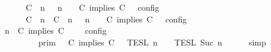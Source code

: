 \begin{isabellebody}
\ \ \ \ \ \ {\isacharequal}\ {\isasymlbrakk}\ {\isacharparenleft}{\isacharparenleft}C\ {\isasymnot}{\isasymUp}\ n{\isacharparenright}\ {\isacharhash}\ {\isasymGamma}{\isacharparenright}{\isacharcomma}\ n\ {\isasymturnstile}\ {\isasymPsi}\ {\isasymtriangleright}\ {\isacharparenleft}{\isacharparenleft}C\ implies\ C\ {\isacharhash}\ {\isasymPhi}{\isacharparenright}\ {\isasymrbrakk}\isactrlsub c\isactrlsub o\isactrlsub n\isactrlsub f\isactrlsub i\isactrlsub g\isanewline
\ \ \ \ \ \ {\isasymunion}\ {\isasymlbrakk}\ {\isacharparenleft}{\isacharparenleft}C\ {\isasymUp}\ n{\isacharparenright}\ {\isacharhash}\ {\isacharparenleft}C\ {\isasymUp}\ n{\isacharparenright}\ {\isacharhash}\ {\isasymGamma}{\isacharparenright}{\isacharcomma}\ n\ {\isasymturnstile}\ {\isasymPsi}\ {\isasymtriangleright}\ {\isacharparenleft}{\isacharparenleft}C\ implies\ C\ {\isacharhash}\ {\isasymPhi}{\isacharparenright}\ {\isasymrbrakk}\isactrlsub c\isactrlsub o\isactrlsub n\isactrlsub f\isactrlsub i\isactrlsub g{\isacartoucheclose}\isanewline
%
\isadelimproof
%
\endisadelimproof
%
\isatagproof
{}\isamarkupfalse%
\ {\isacharminus}\isanewline
\ \ \isamarkupfalse%
\ {\isacartoucheopen}{\isasymlbrakk}\ {\isasymGamma}{\isacharcomma}\ n\ {\isasymturnstile}\ {\isacharparenleft}C\ implies\ C\ {\isacharhash}\ {\isasymPsi}\ {\isasymtriangleright}\ {\isasymPhi}\ {\isasymrbrakk}\isactrlsub c\isactrlsub o\isactrlsub n\isactrlsub f\isactrlsub i\isactrlsub g\isanewline
\ \ \ \ \ \ \ \ {\isacharequal}\ {\isasymlbrakk}{\isasymlbrakk}\ {\isasymGamma}\ {\isasymrbrakk}{\isasymrbrakk}\isactrlsub p\isactrlsub r\isactrlsub i\isactrlsub m\ {\isasyminter}\ {\isasymlbrakk}{\isasymlbrakk}\ {\isacharparenleft}C\ implies\ C\ {\isacharhash}\ {\isasymPsi}\ {\isasymrbrakk}{\isasymrbrakk}\isactrlsub T\isactrlsub E\isactrlsub S\isactrlsub L\isactrlbsup {\isasymge}\ n\isactrlesup \ {\isasyminter}\ {\isasymlbrakk}{\isasymlbrakk}\ {\isasymPhi}\ {\isasymrbrakk}{\isasymrbrakk}\isactrlsub T\isactrlsub E\isactrlsub S\isactrlsub L\isactrlbsup {\isasymge}\ Suc\ n\isactrlesup {\isacartoucheclose}\isanewline
\ \ \ \ \isamarkupfalse%
\ simp\isanewline
\ \ \isamarkupfalse%
\ \isamarkupfalse%

\end{isabellebody}

